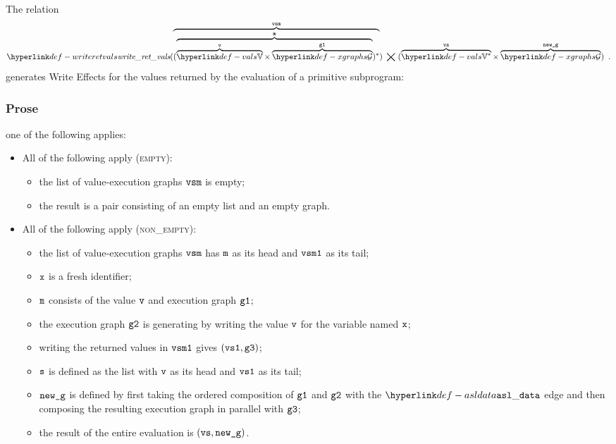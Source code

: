 \hypertarget{def-writeretvals}{}
The relation
\[
  \writeretvals(\overname{(\overname{\overname{\vals}{\vv}\times\overname{\XGraphs}{\vgone}}{\vm})^*}{\vvsm}) \;\aslrel\;
  (\overname{\vals^*}{\vvs}\times\overname{\XGraphs}{\newg}) \enspace.
\]
generates Write Effects for the values
returned by the evaluation of a primitive subprogram:

\subsubsection{Prose}
  one of the following applies:
  \begin{itemize}
  \item All of the following apply (\textsc{empty}):
  \begin{itemize}
    \item the list of value-execution graphs $\texttt{vsm}$ is empty;
    \item the result is a pair consisting of an empty list and an empty graph.
  \end{itemize}

  \item All of the following apply (\textsc{non\_empty}):
  \begin{itemize}
    \item the list of value-execution graphs $\texttt{vsm}$ has $\texttt{m}$ as its head and $\texttt{vsm1}$ as its tail;
    \item $\texttt{x}$ is a fresh identifier;
    \item $\texttt{m}$ consists of the value $\texttt{v}$ and execution graph $\texttt{g1}$;
    \item the execution graph $\texttt{g2}$ is generating by writing the value $\texttt{v}$ for the variable named $\texttt{x}$;
    \item writing the returned values in $\texttt{vsm1}$ gives $(\texttt{vs1}, \texttt{g3})$;
    \item $\texttt{s}$ is defined as the list with $\texttt{v}$ as its head and $\texttt{vs1}$ as its tail;
    \item $\texttt{new\_g}$ is defined by first taking the ordered composition of $\texttt{g1}$ and $\texttt{g2}$ with the $\asldata$ edge
    and then composing the resulting execution graph in parallel with $\texttt{g3}$;
    \item the result of the entire evaluation is $(\texttt{vs}, \texttt{new\_g})$.
  \end{itemize}
\end{itemize}

%

